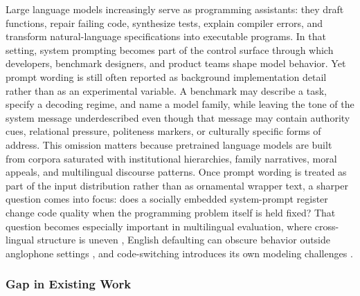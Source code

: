 \documentclass{article}
\begin{document}
\label{sec:motivation_and_problem_setting}

Large language models increasingly serve as programming assistants: they draft functions, repair failing code, synthesize tests, explain compiler errors, and transform natural-language specifications into executable programs. In that setting, system prompting becomes part of the control surface through which developers, benchmark designers, and product teams shape model behavior. Yet prompt wording is still often reported as background implementation detail rather than as an experimental variable. A benchmark may describe a task, specify a decoding regime, and name a model family, while leaving the tone of the system message underdescribed even though that message may contain authority cues, relational pressure, politeness markers, or culturally specific forms of address. This omission matters because pretrained language models are built from corpora saturated with institutional hierarchies, family narratives, moral appeals, and multilingual discourse patterns. Once prompt wording is treated as part of the input distribution rather than as ornamental wrapper text, a sharper question comes into focus: does a socially embedded system-prompt register change code quality when the programming problem itself is held fixed? That question becomes especially important in multilingual evaluation, where cross-lingual structure is uneven \cite{conneau2020emerging}, English defaulting can obscure behavior outside anglophone settings \cite{blasi2022overreliance}, and code-switching introduces its own modeling challenges \cite{qin2020cosdaml, krishnan2021multilingual, zhang2023multilingual}.

\subsubsection{Gap in Existing Work}

\label{sec:gap_in_existing_work}
\end{document}
